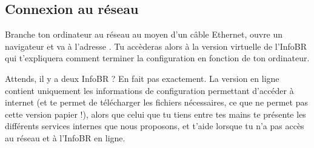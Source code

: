 
\subsection{Connexion au réseau}

Branche ton ordinateur au réseau au moyen d'un câble Ethernet, ouvre un navigateur et va à l'adresse . Tu accèderas alors à la version virtuelle de l'InfoBR qui t'expliquera comment terminer la configuration en fonction de ton ordinateur.


Attends, il y a deux InfoBR ? En fait pas exactement. La version en ligne contient uniquement les informations de configuration permettant d'accéder à internet (et te permet de télécharger les fichiers nécessaires, ce que ne permet pas cette version papier !), alors que celui que tu tiens entre tes mains te présente les différents services internes que nous proposons, et t'aide lorsque tu n'a pas accès au réseau et à l'InfoBR en ligne.

\clearpage